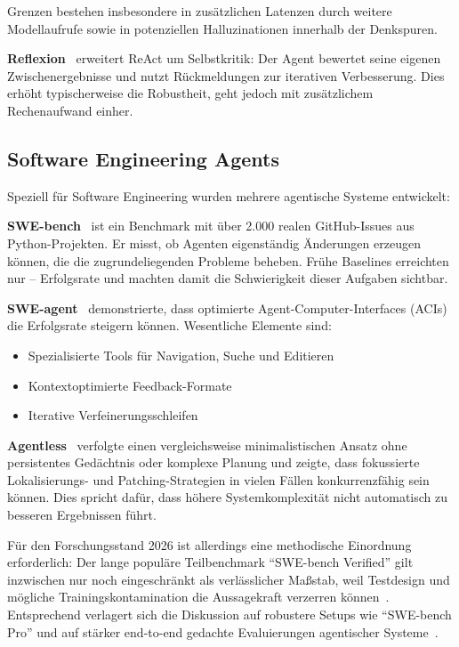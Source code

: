 Grenzen bestehen insbesondere in zusätzlichen Latenzen durch weitere Modellaufrufe sowie in potenziellen Halluzinationen innerhalb der Denkspuren.

\textbf{Reflexion}~\cite{shinn2023reflexion} erweitert ReAct um Selbstkritik: Der Agent bewertet seine eigenen Zwischenergebnisse und nutzt Rückmeldungen zur iterativen Verbesserung. Dies erhöht typischerweise die Robustheit, geht jedoch mit zusätzlichem Rechenaufwand einher.

\subsection{Software Engineering Agents}

Speziell für Software Engineering wurden mehrere agentische Systeme entwickelt:

\textbf{SWE-bench}~\cite{jimenez2023swe} ist ein Benchmark mit über 2.000 realen GitHub-Issues aus Python-Projekten. Er misst, ob Agenten eigenständig Änderungen erzeugen können, die die zugrundeliegenden Probleme beheben. Frühe Baselines erreichten nur -- Erfolgsrate und machten damit die Schwierigkeit dieser Aufgaben sichtbar.

\textbf{SWE-agent}~\cite{yang2024sweagent} demonstrierte, dass optimierte Agent-Computer-Interfaces (ACIs) die Erfolgsrate steigern können. Wesentliche Elemente sind:
\begin{itemize}
  \item Spezialisierte Tools für Navigation, Suche und Editieren
  \item Kontextoptimierte Feedback-Formate
  \item Iterative Verfeinerungsschleifen
\end{itemize}

\textbf{Agentless}~\cite{zhang2024agentless} verfolgte einen vergleichsweise minimalistischen Ansatz ohne persistentes Gedächtnis oder komplexe Planung und zeigte, dass fokussierte Lokalisierungs- und Patching-Strategien in vielen Fällen konkurrenzfähig sein können. Dies spricht dafür, dass höhere Systemkomplexität nicht automatisch zu besseren Ergebnissen führt.

Für den Forschungsstand 2026 ist allerdings eine methodische Einordnung erforderlich: Der lange populäre Teilbenchmark \enquote{SWE-bench Verified} gilt inzwischen nur noch eingeschränkt als verlässlicher Maßstab, weil Testdesign und mögliche Trainingskontamination die Aussagekraft verzerren können~\cite{openai2026swebenchverified}. Entsprechend verlagert sich die Diskussion auf robustere Setups wie \enquote{SWE-bench Pro} und auf stärker end-to-end gedachte Evaluierungen agentischer Systeme~\cite{swebench2026leaderboard}.

